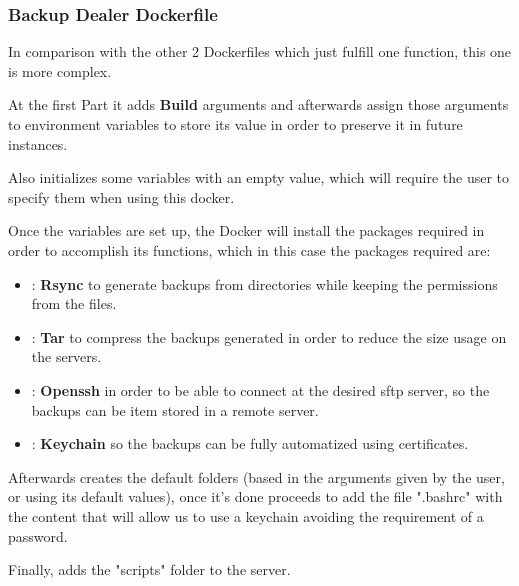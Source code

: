     \subsubsection[Backup Dealer Dockerfile]{Backup Dealer Dockerfile}
    
    \begin{flushleft}
        In comparison with the other 2 Dockerfiles which just fulfill one function, this one is more complex.
    \end{flushleft}
    \begin{flushleft}
        At the first Part it adds \textbf{Build} arguments and afterwards assign those arguments to environment variables
        to store its value in order to preserve it in future instances.

        Also initializes some variables with an empty value, which will require the user to specify them when using this docker.
    \end{flushleft}
    \begin{flushleft}
        Once the variables are set up, the Docker will install the packages required in order to accomplish its functions, which in this case the packages required are:
        \begin{itemize}
            \item : \textbf{Rsync} to generate backups from directories while keeping the permissions from the files.
            \item : \textbf{Tar} to compress the backups generated in order to reduce the size usage on the servers.
            \item : \textbf{Openssh} in order to be able to connect at the desired sftp server, so the backups can be
            item stored in a remote server.
            \item : \textbf{Keychain} so the backups can be fully automatized using certificates.
        \end{itemize}
    \end{flushleft}

    \begin{flushleft}
        Afterwards creates the default folders (based in the arguments given by the user, or using its default values),
        once it's done proceeds to add the file ".bashrc" with the content that will allow us to use a keychain avoiding the
        requirement of a password.
    \end{flushleft}
    \begin{flushleft}
        Finally, adds the "scripts" folder to the server.
    \end{flushleft}



